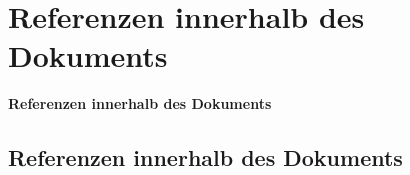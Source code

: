 \documentclass["WS\space 16-17\space -\space LaTeX-Kurs\space -\space Praesentation\space -\space 3.tex"]{subfiles}
\begin{document}
\section{Referenzen innerhalb des Dokuments}
\begin{frame}[c]
	\begin{center}
		\LARGE \textbf{Referenzen innerhalb des Dokuments}
	\end{center}
\end{frame}
\subsection*{Referenzen innerhalb des Dokuments}
\end{document}
